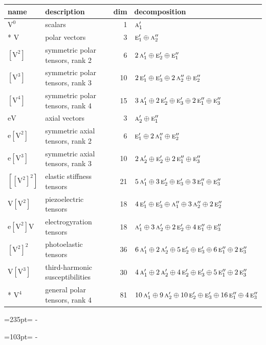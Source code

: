 \documentclass[10pt,a4paper]{article}
\newcommand{\needspace}[1]{\par\penalty-100\begingroup\dimen0=#1\relax\dimen2=\pagegoal
  \advance\dimen2-\pagetotal\ifdim\dimen0>\dimen2\relax\ifdim\dimen2>0pt\vfil\break\fi\fi
  \endgroup}
\numberwithin{equation}{section}
\newcommand{\irr}[1]{\text{\normalfont\scshape #1}}
\newcommand{\jahn}[1]{\mathrm{#1}}
\newlength{\fillwidth}\newlength{\cellwidth}\newlength{\colwidth}
\begin{document}
{\begin{longtable}{@{}llr>{\RaggedRight\arraybackslash}p{\fillwidth}@{}}
name & description & dim & decomposition\\\midrule\endhead
\bottomrule\endfoot\endlastfoot
$\jahn{V^{0}}$ & scalars & 1 & $\irr{a}_{1}'$\\*
$\jahn{V}$ & polar vectors & 3 & $\irr{e}_{1}' \oplus\allowbreak \irr{a}_{2}''$\\
$\jahn{[V^{2}]}$ & symmetric polar tensors, rank 2 & 6 & $2\,\irr{a}_{1}' \oplus\allowbreak \irr{e}_{2}' \oplus\allowbreak \irr{e}_{1}''$\\
$\jahn{[V^{3}]}$ & symmetric polar tensors, rank 3 & 10 & $2\,\irr{e}_{1}' \oplus\allowbreak \irr{e}_{3}' \oplus\allowbreak 2\,\irr{a}_{2}'' \oplus\allowbreak \irr{e}_{2}''$\\
$\jahn{[V^{4}]}$ & symmetric polar tensors, rank 4 & 15 & $3\,\irr{a}_{1}' \oplus\allowbreak 2\,\irr{e}_{2}' \oplus\allowbreak \irr{e}_{3}' \oplus\allowbreak 2\,\irr{e}_{1}'' \oplus\allowbreak \irr{e}_{3}''$\\
$\jahn{eV}$ & axial vectors & 3 & $\irr{a}_{2}' \oplus\allowbreak \irr{e}_{1}''$\\
$\jahn{e[V^{2}]}$ & symmetric axial tensors, rank 2 & 6 & $\irr{e}_{1}' \oplus\allowbreak 2\,\irr{a}_{1}'' \oplus\allowbreak \irr{e}_{2}''$\\
$\jahn{e[V^{3}]}$ & symmetric axial tensors, rank 3 & 10 & $2\,\irr{a}_{2}' \oplus\allowbreak \irr{e}_{2}' \oplus\allowbreak 2\,\irr{e}_{1}'' \oplus\allowbreak \irr{e}_{3}''$\\
$\jahn{[[V^{2}]^{2}]}$ & elastic stiffness tensors & 21 & $5\,\irr{a}_{1}' \oplus\allowbreak 3\,\irr{e}_{2}' \oplus\allowbreak \irr{e}_{3}' \oplus\allowbreak 3\,\irr{e}_{1}'' \oplus\allowbreak \irr{e}_{3}''$\\
$\jahn{V[V^{2}]}$ & piezoelectric tensors & 18 & $4\,\irr{e}_{1}' \oplus\allowbreak \irr{e}_{3}' \oplus\allowbreak \irr{a}_{1}'' \oplus\allowbreak 3\,\irr{a}_{2}'' \oplus\allowbreak 2\,\irr{e}_{2}''$\\
$\jahn{e[V^{2}]V}$ & electrogyration tensors & 18 & $\irr{a}_{1}' \oplus\allowbreak 3\,\irr{a}_{2}' \oplus\allowbreak 2\,\irr{e}_{2}' \oplus\allowbreak 4\,\irr{e}_{1}'' \oplus\allowbreak \irr{e}_{3}''$\\
$\jahn{[V^{2}]^{2}}$ & photoelastic tensors & 36 & $6\,\irr{a}_{1}' \oplus\allowbreak 2\,\irr{a}_{2}' \oplus\allowbreak 5\,\irr{e}_{2}' \oplus\allowbreak \irr{e}_{3}' \oplus\allowbreak 6\,\irr{e}_{1}'' \oplus\allowbreak 2\,\irr{e}_{3}''$\\
$\jahn{V[V^{3}]}$ & third-harmonic susceptibilities & 30 & $4\,\irr{a}_{1}' \oplus\allowbreak 2\,\irr{a}_{2}' \oplus\allowbreak 4\,\irr{e}_{2}' \oplus\allowbreak \irr{e}_{3}' \oplus\allowbreak 5\,\irr{e}_{1}'' \oplus\allowbreak 2\,\irr{e}_{3}''$\\*
$\jahn{V^{4}}$ & general polar tensors, rank 4 & 81 & $10\,\irr{a}_{1}' \oplus\allowbreak 9\,\irr{a}_{2}' \oplus\allowbreak 10\,\irr{e}_{2}' \oplus\allowbreak \irr{e}_{3}' \oplus\allowbreak 16\,\irr{e}_{1}'' \oplus\allowbreak 4\,\irr{e}_{3}''$\\
\bottomrule\end{longtable}}
\needspace{235pt}
\needspace{103pt}
\end{document}
